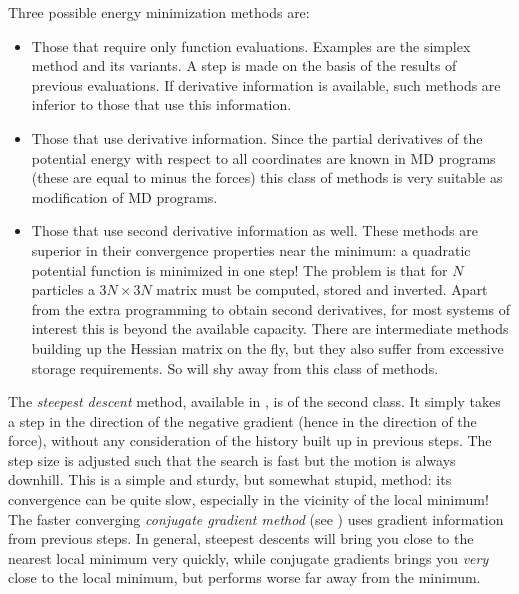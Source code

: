 Three possible energy minimization methods are:
\begin{itemize}
\item   Those that require only function evaluations. Examples are the 
        simplex method and its variants. A step is made on the basis of the 
        results of previous evaluations. If derivative information is 
        available, such methods are inferior to those that use 
        this information.
\item   Those that use derivative information. Since the partial 
        derivatives of the potential energy with respect to all 
        coordinates are known in MD programs (these are equal to minus 
        the forces) this class of methods is very suitable as modification 
        of MD programs.
\item   Those that use second derivative information as well. These methods 
        are superior in their convergence properties near the minimum: a 
        quadratic potential function is minimized in one step! The problem 
        is that for $N$ particles a $3N\times 3N$ matrix must be computed, 
        stored and inverted. Apart from the extra programming to obtain 
        second derivatives, for most systems of interest this is beyond the 
        available capacity. There are intermediate methods building up the 
        Hessian matrix on the fly, but they also suffer from excessive 
        storage requirements. So {\gromacs} will shy away from this class 
        of methods.
\end{itemize}


The {\em steepest descent} method, available in {\gromacs}, is of the
second class. It simply takes a step in the direction of the negative
gradient (hence in the direction of the force), without any
consideration of the history built up in previous steps. The step size
is adjusted such that the search is fast but the motion is always
downhill. This is a simple and sturdy, but somewhat stupid, method:
its convergence can be quite slow, especially in the vicinity of the
local minimum! The faster converging {\em conjugate gradient method}
(see {\eg} \cite{Zimmerman91}) uses gradient information from previous
steps. In general, steepest descents will bring you close to the
nearest local minimum very quickly, while conjugate gradients brings
you {\em very} close to the local minimum, but performs worse far away
from the minimum.
